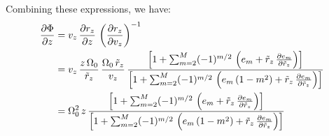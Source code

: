 Combining these expressions, we have:
\begin{align}
    \frac{\partial \Phi}{\partial z} &=
        v_z \, \frac{\partial r_z}{\partial z} \,
        \left( \frac{\partial r_z}{\partial v_z} \right)^{-1}\\
    &= v_z \, \frac{z\,\Omega_0}{\tilde{r}_z} \, \frac{\Omega_0 \, \tilde{r}_z}{v_z} \,
        \frac{\left[
            1 + \sum_{m=2}^{M} (-1)^{m/2} \,
                \left(e_m + \tilde{r}_z \, \frac{\partial e_m}{\partial \tilde{r}_z}\right)
        \right]}{\left[
            1 + \sum_{m=2}^{M} (-1)^{m/2} \,
                \left(e_m\,(1 - m^2) + \tilde{r}_z \, \frac{\partial e_m}{\partial \tilde{r}_z}\right)
        \right]} \\
    &= \Omega_0^2 \, z \,
        \frac{\left[
            1 + \sum_{m=2}^{M} (-1)^{m/2} \,
                \left(e_m + \tilde{r}_z \, \frac{\partial e_m}{\partial \tilde{r}_z}\right)
        \right]}{\left[
            1 + \sum_{m=2}^{M} (-1)^{m/2} \,
                \left(e_m\,(1 - m^2) + \tilde{r}_z \, \frac{\partial e_m}{\partial \tilde{r}_z}\right)
        \right]}
\end{align}






